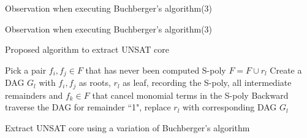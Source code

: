 \documentclass[xcolor=dvipsnames]{beamer}
\begin{document}
\begin{frame}{\large{Observation when executing Buchberger's algorithm(3)}}
\begin{figure}[H]
\end{figure}
\end{frame}
\begin{frame}{\large{Observation when executing Buchberger's algorithm(3)}}
\begin{figure}[H]
\end{figure}
\end{frame}
\begin{frame}{\large{Proposed algorithm to extract UNSAT core}}
\begin{algorithm}[H]
\SetAlgoNoLine
{
	Pick a pair $f_i,f_j\in F$ that has never been computed S-poly\;
	{
		$F = F\cup r_l$\;
		Create a DAG $G_l$ with $f_i,f_j$ as roots, $r_l$ as leaf, recording the S-poly, all intermediate remainders and $f_k\in F$ that cancel monomial terms in the S-poly\;
	}
}
Backward traverse the DAG for remainder ``1", replace $r_l$ with corresponding DAG $G_l$\;
\caption {Extract UNSAT core using a variation of Buchberger's algorithm}
\end{algorithm}
\end{frame}
\end{document}
